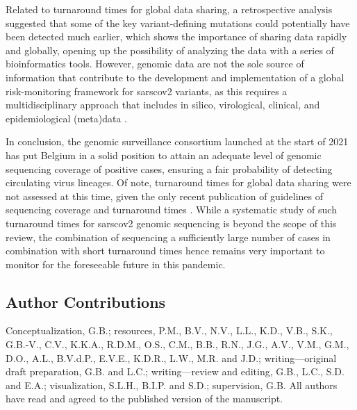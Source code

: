 Related to turnaround times for global data sharing, a retrospective analysis \citep{maher2022predicting} suggested that some of the key variant-defining mutations could potentially have been detected much earlier, which shows the importance of sharing data rapidly and globally, opening up the possibility of analyzing the data with a series of bioinformatics tools.
However, genomic data are not the sole source of information that contribute to the development and implementation of a global risk-monitoring framework for \gls{sarscov2} variants, as this requires a multidisciplinary approach that includes in silico, virological, clinical, and epidemiological (meta)data \citep{subissi2022early}.

In conclusion, the genomic surveillance consortium launched at the start of 2021 has put Belgium in a solid position to attain an adequate level of genomic sequencing coverage of positive cases, ensuring a fair probability of detecting circulating virus lineages.
Of note, turnaround times for global data sharing were not assessed at this time, given the only recent publication of guidelines of sequencing coverage and turnaround times \citep{brito2022global}.
While a systematic study of such turnaround times for \gls{sarscov2} genomic sequencing is beyond the scope of this review, the combination of sequencing a sufficiently large number of cases in combination with short turnaround times hence remains very important to monitor for the foreseeable future in this pandemic.

\subsection*{Author Contributions}
Conceptualization, G.B.; resources, P.M., B.V., N.V., L.L., K.D., V.B., S.K., G.B.-V., C.V., K.K.A., R.D.M., O.S., C.M., B.B., R.N., J.G., A.V., V.M., G.M., D.O., A.L., B.V.d.P., E.V.E., K.D.R., L.W., M.R. and J.D.; writing—original draft preparation, G.B. and L.C.; writing—review and editing, G.B., L.C., S.D. and E.A.; visualization, S.L.H., B.I.P. and S.D.; supervision, G.B.
All authors have read and agreed to the published version of the manuscript.

